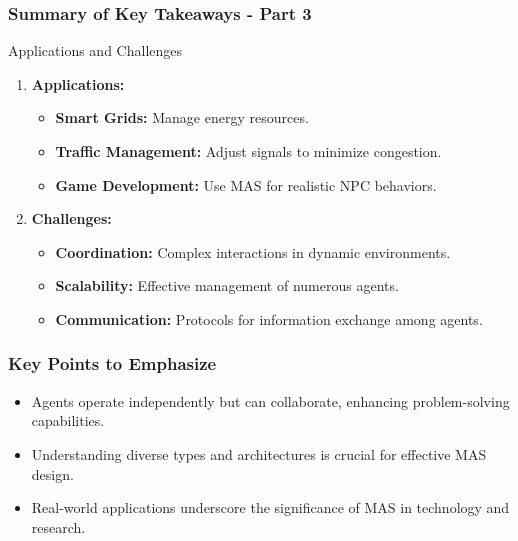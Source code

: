 \documentclass[aspectratio=169]{beamer}
\begin{document}
\begin{frame}[fragile]
    \frametitle{Summary of Key Takeaways - Part 3}
    \begin{block}{Applications and Challenges}
        \begin{enumerate}
            \item \textbf{Applications:}
                \begin{itemize}
                    \item \textbf{Smart Grids:} Manage energy resources.
                    \item \textbf{Traffic Management:} Adjust signals to minimize congestion.
                    \item \textbf{Game Development:} Use MAS for realistic NPC behaviors.
                \end{itemize}
            \item \textbf{Challenges:}
                \begin{itemize}
                    \item \textbf{Coordination:} Complex interactions in dynamic environments.
                    \item \textbf{Scalability:} Effective management of numerous agents.
                    \item \textbf{Communication:} Protocols for information exchange among agents.
                \end{itemize}
        \end{enumerate}
    \end{block}
\end{frame}

\begin{frame}[fragile]
    \frametitle{Key Points to Emphasize}
    \begin{itemize}
        \item Agents operate independently but can collaborate, enhancing problem-solving capabilities.
        \item Understanding diverse types and architectures is crucial for effective MAS design.
        \item Real-world applications underscore the significance of MAS in technology and research.
    \end{itemize}
\end{frame}
\end{document}
